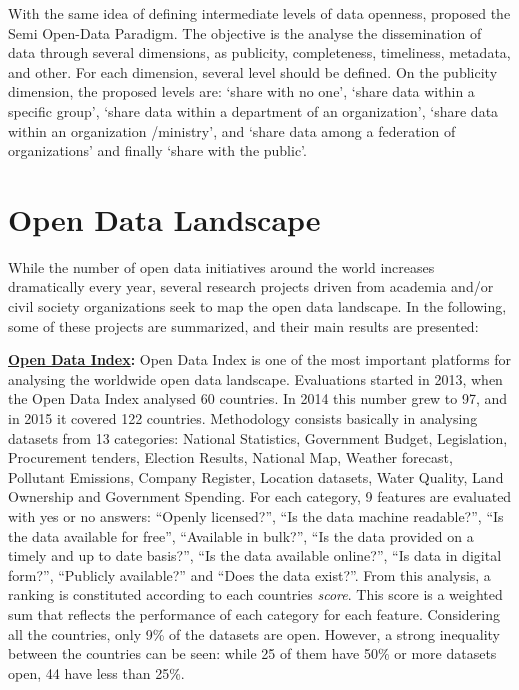 With the same idea of defining intermediate levels of data openness,  proposed the Semi Open-Data Paradigm.
The objective is the analyse the dissemination of data through several dimensions, as publicity, completeness, timeliness, metadata, and other.
For each dimension, several level should be defined.
On the publicity dimension, the proposed levels are: ‘share with no one’, ‘share data within a specific group’, ‘share data within a department of an organization’, ‘share data within an organization /ministry’, and ‘share data among a federation of organizations’ and finally ‘share with the public’.

\section{Open Data Landscape}
\label{sec:opendatalandscape}

While the number of open data initiatives around the world increases dramatically every year, several research projects driven from academia and/or civil society organizations seek to map the open data landscape.
In the following, some of these projects are summarized, and their main results are presented:

\textbf{\href{http://index.okfn.org/}{Open Data Index}:} Open Data Index is one of the most important platforms for analysing the worldwide open data landscape.
Evaluations started in 2013, when the Open Data Index analysed 60 countries. In 2014 this number grew to 97, and in 2015 it covered 122 countries.
Methodology consists basically in analysing datasets from 13 categories: 
National Statistics, Government Budget, Legislation, Procurement tenders, Election Results, National Map, Weather forecast, Pollutant Emissions, Company Register, Location datasets, Water Quality, Land Ownership and Government Spending.
For each category, 9 features are evaluated with yes or no answers: ``Openly licensed?'', ``Is the data machine readable?'', ``Is the data available for free'',  ``Available in bulk?'', ``Is the data provided on a timely and up to date basis?'', ``Is the data available online?'', ``Is data in digital form?'', ``Publicly available?'' and ``Does the data exist?''.
From this analysis, a ranking is constituted according to each countries \emph{score}. 
This score is a weighted sum that reflects the performance of each category for each feature.
Considering all the countries, only 9\% of the datasets are open. 
However, a strong inequality between the countries can be seen: while 25 of them have 50\% or more datasets open, 44 have less than 25\%.

